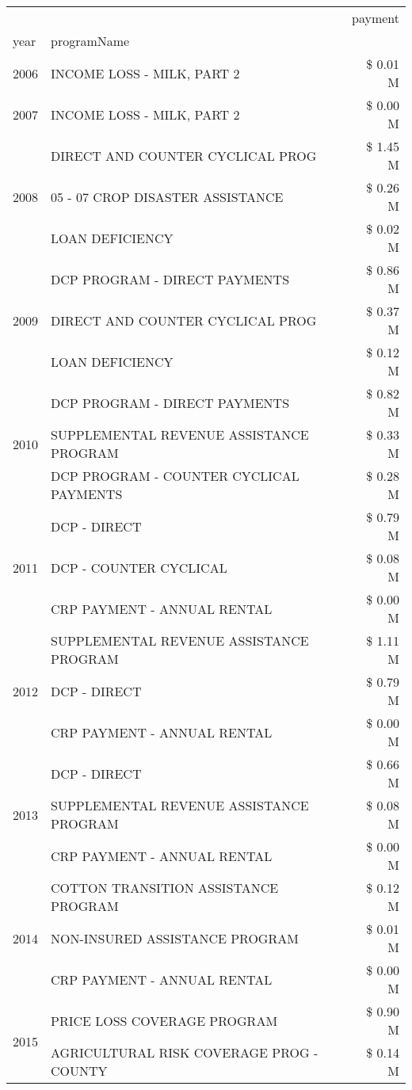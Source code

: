 \begin{tabular}{llr}
\toprule
 &  & payment \\
year & programName &  \\
\midrule
2006 & INCOME LOSS - MILK, PART 2 & \$ 0.01 M \\
\cline{1-3}
2007 & INCOME LOSS - MILK, PART 2 & \$ 0.00 M \\
\cline{1-3}
\multirow[t]{3}{*}{2008} & DIRECT AND COUNTER CYCLICAL PROG & \$ 1.45 M \\
 & 05 - 07 CROP DISASTER ASSISTANCE & \$ 0.26 M \\
 & LOAN DEFICIENCY & \$ 0.02 M \\
\cline{1-3}
\multirow[t]{3}{*}{2009} & DCP PROGRAM - DIRECT PAYMENTS & \$ 0.86 M \\
 & DIRECT AND COUNTER CYCLICAL PROG & \$ 0.37 M \\
 & LOAN DEFICIENCY & \$ 0.12 M \\
\cline{1-3}
\multirow[t]{3}{*}{2010} & DCP PROGRAM - DIRECT PAYMENTS & \$ 0.82 M \\
 & SUPPLEMENTAL REVENUE ASSISTANCE PROGRAM & \$ 0.33 M \\
 & DCP PROGRAM - COUNTER CYCLICAL PAYMENTS & \$ 0.28 M \\
\cline{1-3}
\multirow[t]{3}{*}{2011} & DCP - DIRECT & \$ 0.79 M \\
 & DCP - COUNTER CYCLICAL & \$ 0.08 M \\
 & CRP PAYMENT - ANNUAL RENTAL & \$ 0.00 M \\
\cline{1-3}
\multirow[t]{3}{*}{2012} & SUPPLEMENTAL REVENUE ASSISTANCE PROGRAM & \$ 1.11 M \\
 & DCP - DIRECT & \$ 0.79 M \\
 & CRP PAYMENT - ANNUAL RENTAL & \$ 0.00 M \\
\cline{1-3}
\multirow[t]{3}{*}{2013} & DCP - DIRECT & \$ 0.66 M \\
 & SUPPLEMENTAL REVENUE ASSISTANCE PROGRAM & \$ 0.08 M \\
 & CRP PAYMENT - ANNUAL RENTAL & \$ 0.00 M \\
\cline{1-3}
\multirow[t]{3}{*}{2014} & COTTON TRANSITION ASSISTANCE PROGRAM & \$ 0.12 M \\
 & NON-INSURED ASSISTANCE PROGRAM & \$ 0.01 M \\
 & CRP PAYMENT - ANNUAL RENTAL & \$ 0.00 M \\
\cline{1-3}
\multirow[t]{3}{*}{2015} & PRICE LOSS COVERAGE PROGRAM & \$ 0.90 M \\
 & AGRICULTURAL RISK COVERAGE PROG - COUNTY & \$ 0.14 M \\

\end{tabular}
